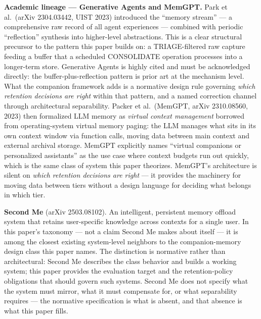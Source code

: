 \documentclass[
  11pt,
]{article}
\begin{document}
\textbf{Academic lineage --- Generative Agents and MemGPT.} Park et
al.~(arXiv 2304.03442, UIST 2023) introduced the ``memory stream'' --- a
comprehensive raw record of all agent experiences --- combined with
periodic ``reflection'' synthesis into higher-level abstractions. This
is a clear structural precursor to the pattern this paper builds on: a
TRIAGE-filtered raw capture feeding a buffer that a scheduled
CONSOLIDATE operation processes into a longer-term store. Generative
Agents is highly cited and must be acknowledged directly: the
buffer-plus-reflection pattern is prior art at the mechanism level. What
the companion framework adds is a normative design rule governing
\emph{which retention decisions are right} within that pattern, and a
named correction channel through architectural separability. Packer et
al.~(MemGPT, arXiv 2310.08560, 2023) then formalized LLM memory as
\emph{virtual context management} borrowed from operating-system virtual
memory paging: the LLM manages what sits in its own context window via
function calls, moving data between main context and external archival
storage. MemGPT explicitly names ``virtual companions or personalized
assistants'' as the use case where context budgets run out quickly,
which is the same class of system this paper theorizes. MemGPT's
architecture is silent on \emph{which retention decisions are right} ---
it provides the machinery for moving data between tiers without a design
language for deciding what belongs in which tier.

\textbf{Second Me} (arXiv 2503.08102). An intelligent, persistent memory
offload system that retains user-specific knowledge across contexts for
a single user. In this paper's taxonomy --- not a claim Second Me makes
about itself --- it is among the closest existing system-level neighbors
to the companion-memory design class this paper names. The distinction
is normative rather than architectural: Second Me describes the class
behavior and builds a working system; this paper provides the evaluation
target and the retention-policy obligations that should govern such
systems. Second Me does not specify what the system must mirror, what it
must compensate for, or what separability requires --- the normative
specification is what is absent, and that absence is what this paper
fills.
\end{document}

